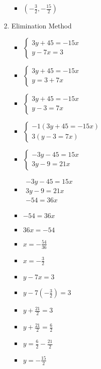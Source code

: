 \documentclass{article}
\begin{document}
\begin{enumerate}
\begin{enumerate}
\begin{itemize}
    \item {\Large $\left(-\frac{3}{2},-\frac{15}{2}\right)$}
    \end{itemize}
  \item Elimination Method
    \begin{itemize}
    \item $\left\{ \begin{array}{l}
          3y+45=-15x \\
          y-7x=3 \end{array} \right.$
    \item $\left\{ \begin{array}{l}
          3y+45=-15x \\
          y=3+7x \end{array} \right.$
    \item $\left\{ \begin{array}{l}
          3y+45=-15x \\
          y-3=7x \end{array} \right.$
    \item $\left\{ \begin{array}{l}
          -1(3y+45=-15x) \\
          3(y-3=7x) \end{array} \right.$
    \item $\left\{ \begin{array}{l}
          -3y-45=15x \\
          3y-9=21x \end{array} \right.$
    \item $\begin{array}{l}
          -3y-45=15x \\
          3y-9=21x \\ \hline
          -54=36x \end{array}$
    \item $-54=36x$
    \item $36x=-54$
    \item {\Large $x=-\frac{54}{36}$}
    \item {\Large $x=-\frac{3}{2}$}
    \item $y-7x=3$
    \item {\Large $y-7\left(-\frac{3}{2}\right)=3$}
    \item {\Large $y+\frac{21}{2}=3$}
    \item {\Large $y+\frac{21}{2}=\frac{6}{2}$}
    \item {\Large $y=\frac{6}{2}-\frac{21}{2}$}
    \item {\Large $y=-\frac{15}{2}$}

\end{itemize}
\end{enumerate}
\end{enumerate}
\end{document}
